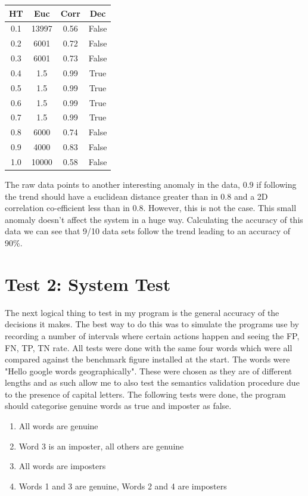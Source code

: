 \documentclass[10pt,a4paper]{report}
\begin{document}
\begin{center}
	\begin{tabular}{|c|c|c|c|}
	\hline
	HT & Euc & Corr & Dec \\ [0.5ex]
	\hline
	\hline
	0.1 & 13997 & 0.56 & False \\
	0.2 & 6001 & 0.72 & False \\
	0.3 & 6001 & 0.73 & False \\
	0.4 & 1.5 & 0.99 & True \\
	0.5 & 1.5 & 0.99 & True \\
	0.6 & 1.5 & 0.99 & True \\
	0.7 & 1.5 & 0.99 & True \\
	0.8 & 6000 & 0.74 & False \\
	0.9 & 4000 & 0.83 & False \\
	1.0 & 10000 & 0.58 & False \\
	\hline
	\end{tabular}
\end{center}

The raw data points to another interesting anomaly in the data, \(0.9\) if following the trend should have a euclidean distance greater than in \(0.8\) and a 2D correlation co-efficient less than in \(0.8\). However, this is not the case. This small anomaly doesn't affect the system in a huge way. Calculating the accuracy of this data we can see that 9/10 data sets follow the trend leading to an accuracy of 90\%.

\section{Test 2: System Test}

The next logical thing to test in my program is the general accuracy of the decisions it makes. The best way to do this was to simulate the programs use by recording a number of intervals where certain actions happen and seeing the FP, FN, TP, TN rate. All tests were done with the same four words which were all compared against the benchmark figure installed at the start. The words were "Hello google words geographically". These were chosen as they are of different lengths and as such allow me to also test the semantics validation procedure due to the presence of capital letters. The following tests were done, the program should categorise genuine words as true and imposter as false.

\begin{enumerate}
	\item All words are genuine 
	\item Word 3 is an imposter, all others are genuine
	\item All words are imposters
	\item Words 1 and 3 are genuine, Words 2 and 4 are imposters
\end{enumerate}
\end{document}
